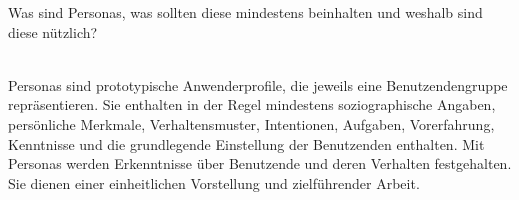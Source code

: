\begin{exercise}
  Was sind Personas, was sollten diese mindestens beinhalten und weshalb sind diese nützlich?
  \\\\
\end{exercise}
Personas sind prototypische Anwenderprofile, die jeweils eine Benutzendengruppe repräsentieren.
Sie enthalten in der Regel mindestens soziographische Angaben, persönliche Merkmale, Verhaltensmuster, Intentionen, Aufgaben, Vorerfahrung, Kenntnisse und die grundlegende Einstellung der Benutzenden enthalten.
Mit Personas werden Erkenntnisse über Benutzende und deren Verhalten festgehalten. Sie dienen einer einheitlichen Vorstellung und zielführender Arbeit.